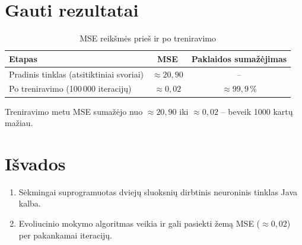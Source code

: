 \documentclass[12pt,a4paper]{article}
\begin{document}
\section*{Gauti rezultatai}

\begin{table}[h]
\centering
\caption{MSE reikšmės prieš ir po treniravimo}
\begin{tabular}{@{}lcc@{}}
\toprule
\textbf{Etapas} & \textbf{MSE} & \textbf{Paklaidos sumažėjimas} \\
\midrule
Pradinis tinklas (atsitiktiniai svoriai) & $\approx 20{,}90$ & -- \\
Po treniravimo (100\,000 iteracijų)      & $\approx 0{,}02$  & $\approx 99{,}9\,\%$ \\
\bottomrule
\end{tabular}
\end{table}

Treniravimo metu MSE sumažėjo nuo $\approx 20{,}90$ iki $\approx 0{,}02$ -- beveik 1000 kartų mažiau.

\section*{Išvados}

\begin{enumerate}
    \item Sėkmingai suprogramuotas dviejų sluoksnių dirbtinis neuroninis tinklas Java kalba.
    \item Evoliucinio mokymo algoritmas veikia ir gali pasiekti žemą MSE ($\approx 0{,}02$) per pakankamai iteracijų.
\end{enumerate}
\end{document}
